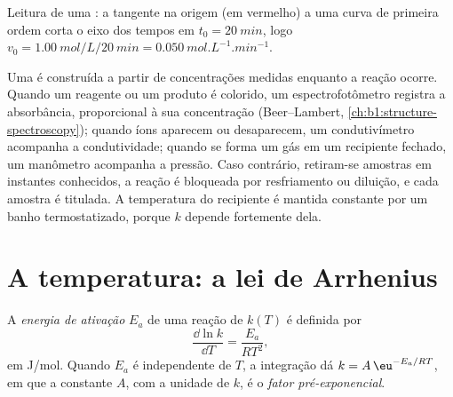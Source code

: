 \begin{omfigure}

{\small Leitura de uma : a tangente na origem (em
vermelho) a uma curva de primeira ordem corta o eixo dos tempos em
$t_0 = \qty{20}{min}$, logo $v_0 =
\qty{1.00}{mol/L}/\qty{20}{min} = \qty{0.050}{mol.L^{-1}.min^{-1}}$.}
\end{omfigure}

\begin{inthelab}
Uma  é construída a partir de concentrações medidas
enquanto a reação ocorre. Quando um reagente ou um produto é colorido, um
espectrofotômetro registra a absorbância, proporcional à sua
concentração (Beer--Lambert, \cref{ch:b1:structure-spectroscopy});
quando íons aparecem ou desaparecem, um condutivímetro acompanha a
condutividade; quando se forma um gás em um recipiente fechado, um
manômetro acompanha a pressão. Caso contrário, retiram-se amostras em
instantes conhecidos, a reação é bloqueada por resfriamento ou diluição,
e cada amostra é titulada. A temperatura do recipiente é mantida
constante por um banho termostatizado, porque $k$ depende fortemente
dela.
\end{inthelab}

\section{A temperatura: a lei de Arrhenius}

\begin{definition}\label{def:b1:rate-laws:activation-energy}
A \emph{energia de ativação} $E_a$ de uma reação
de  $k(T)$ é definida por
\[
  \frac{\dd \ln k}{\dd T} = \frac{E_a}{RT^2} ,
\]
em \unit{J/mol}. Quando $E_a$ é independente de $T$, a integração dá
$k = A\,\eu^{-E_a/RT}$, em que a constante $A$, com a unidade de $k$, é
o \emph{fator pré-exponencial}.
\end{definition}

